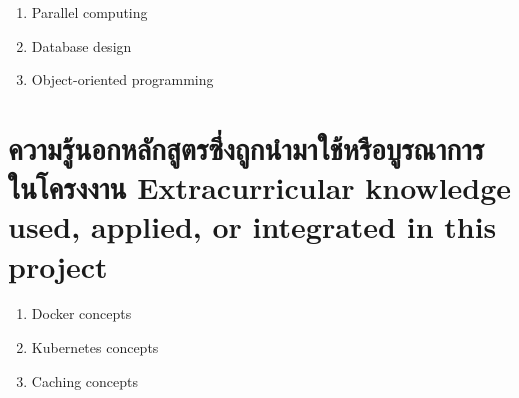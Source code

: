 \begin{enumerate}
    \item Parallel computing
    \item Database design
    \item Object-oriented programming
\end{enumerate}

\section{\ifcpe%
ความรู้นอกหลักสูตรซึ่งถูกนำมาใช้หรือบูรณาการในโครงงาน
\else%
Extracurricular knowledge used, applied, or integrated in this project
\fi
}

\begin{enumerate}
    \item Docker concepts
    \item Kubernetes concepts
    \item Caching concepts
\end{enumerate}
